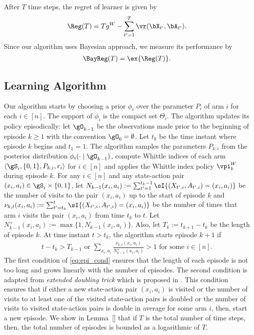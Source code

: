 After $T$ time steps, the regret of learner is given by
\begin{align}
    \Reg(T) = Tg^W - \sum_{t'=1}^{T} \vr(\bX_{t'},\bA_{t'}). \label{eq:regret}
\end{align}
Since our algorithm uses Bayesian approach, we measure its performance by
\begin{align}
    \BayReg(T) = \ex{\Reg(T)}. \label{eq:bayreg}
\end{align}

\subsection{Learning Algorithm}
\label{ssec:learn_algo}

Our algorithm starts by choosing a prior $\phi_i$ over the parameter $P_i$ of arm $i$ for each $i\in[n]$.
The support of $\phi_i$ is the compact set $\Theta_i$. The algorithm updates its policy episodically: let $\gO_{k-1}$ be the observations made prior to the beginning of episode $k\ge1$ with the convention $\gO_{0}=\emptyset$.
Let $t_k$ be the time instant where episode $k$ begins and $t_1=1$.
The algorithm samples the parameters $P_{k,i}$ from the posterior distribution $\phi_i(\cdot \mid \gO_{k-1})$, compute Whittle indices of each arm $\langle\gS_i,\{0,1\},P_{k,i},r_i\rangle$ for $i\in[n]$ and applies the Whittle index policy $\vpi_k^W$ during episode $k$.
For any $i\in[n]$ and any state-action pair $(x_i,a_i)\in\gS_i\times\{0,1\}$, let $N_{k-1}(x_i,a_i):=\sum_{t'=1}^{t_k-1}\sI{(X_{t',i},A_{t',i})=(x_i,a_i)}$ be the number of visits to the pair $(x_i,a_i)$ up to the start of episode $k$ and $\nu_{k,t}(x_i,a_i):=\sum_{t'=t_k}^{t}\sI{(X_{t',i},A_{t',i})=(x_i,a_i)}$ be the number of times that arm $i$ visits the pair $(x_i,a_i)$ from time $t_k$ to $t$. Let $N_{k-1}^+(x_i,a_i):=\max\{1,N_{k-1}(x_i,a_i)\}$. Also, let $T_k:=t_{k+1}-t_{k}$ be the length of episode $k$. At time instant $t>t_k$, the algorithm starts episode $k+1$ if
\begin{align}
    t-t_k > T_{k-1} \text{ or } \sum_{x_i,a_i} \frac{\nu_{k,t}(x_i,a_i)}{N_{k-1}^+(x_i,a_i)}>1 \text{ for some } i\in[n]. \label{eq:epi_cond}
\end{align}
The first condition of \eqref{eq:epi_cond} ensures that the length of each episode is not too long and grows linearly with the number of episodes.
The second condition is adapted from \emph{extended doubling trick} which is proposed in \cite{tossou2019near}.
This condition ensures that if either a new state-action pair $(x_i,a_i)$ is visited or the number of visits to at least one of the visited state-action pairs is doubled or the number of visits to visited state-action pairs is double in average for some arm $i$, then, start a new episode.
We show in Lemma~\ref{} that if $T$ is the total number of time steps, then, the total number of episodes is bounded as a logarithmic of $T$.

